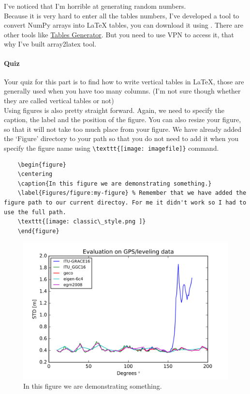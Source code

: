 \documentclass[paper=a4, fontsize=11pt]{scrartcl} %
\numberwithin{equation}{section} %
\numberwithin{figure}{section} %
\numberwithin{table}{section} %
\begin{document}
I've noticed that I'm horrible at generating random numbers.\\
Because it is very hard to enter all the tables numbers, I've developed a tool to convert NumPy arrays into LaTeX tables, you can download it using . There are other tools like \href{http://www.tablesgenerator.com/}{Tables Generator}. But you need to use VPN to access it, that why I've built array2latex tool.\\

\paragraph{Quiz} Your quiz for this part is to find how to write vertical tables in LaTeX, those are generally used when you have too many columns. (I'm not sure though whether they are called vertical tables or not)
\\
Using figures is also pretty straight forward. Again, we need to specify the caption, the label and the position of the figure. You can also resize your figure, so that it will not take too much place from your figure. We have already added the `Figure' directory to your path so that you do not need to add it when you specify the figure name using \verb|\texttt{[image: imagefile]}| command.

\begin{verbatim}
	\begin{figure}
	\centering
	\caption{In this figure we are demonstrating something.}
	\label{Figures/figure:my-figure} % Remember that we have added the figure path to our current directoy. For me it didn't work so I had to use the full path.
	\texttt{[image: classic\_style.png ]}
	\end{figure}
\end{verbatim}

\begin{figure}
	\centering
	\caption{In this figure we are demonstrating something.}
	\label{figure:my-figure}
	\includegraphics{Figures/classic_style.png}
\end{figure}
\end{document}

